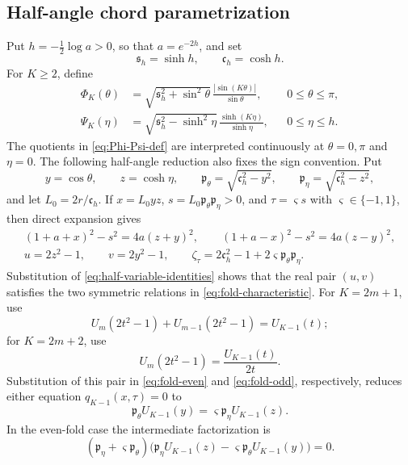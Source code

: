 \documentclass[preprints,article,accept,oneauthor]{Definitions/mdpi}
\numberwithin{equation}{section}
\theoremstyle{mdpi}
\theoremstyle{definition}
\begin{document}
\subsection{Half-angle chord parametrization}
\label{subsec:half-angle-chords}
Put \(h=-\tfrac12\log a>0\), so that \(a=e^{-2h}\), and set
\[
 \mathfrak s_h=\sinh h,\qquad \mathfrak c_h=\cosh h.
\]
For \(K\geq2\), define
\begin{equation}\label{eq:Phi-Psi-def}
\begin{aligned}
 \Phi_K(\theta)
 &=\sqrt{\mathfrak s_h^2+\sin^2\theta}\,
   \frac{|\sin(K\theta)|}{\sin\theta},
   &&0\leq\theta\leq\pi,\\
 \Psi_K(\eta)
 &=\sqrt{\mathfrak s_h^2-\sinh^2\eta}\,
   \frac{\sinh(K\eta)}{\sinh\eta},
   &&0\leq\eta\leq h.
\end{aligned}
\end{equation}
The quotients in \eqref{eq:Phi-Psi-def} are interpreted continuously at
\(\theta=0,\pi\) and \(\eta=0\).  The following half-angle reduction also
fixes the sign convention.  Put
\[
 y=\cos\theta,\qquad z=\cosh\eta,\qquad
 \mathfrak p_\theta=\sqrt{\mathfrak c_h^2-y^2},\qquad
 \mathfrak p_\eta=\sqrt{\mathfrak c_h^2-z^2},
\]
and let \(L_0=2r/\mathfrak c_h\).  If
\(x=L_0yz\), \(s=L_0\mathfrak p_\theta\mathfrak p_\eta>0\), and
\(\tau=\varsigma s\) with \(\varsigma\in\{-1,1\}\), then direct
expansion gives
\begin{equation}\label{eq:half-variable-identities}
\begin{gathered}
 (1+a+x)^2-s^2=4a(z+y)^2,\qquad
 (1+a-x)^2-s^2=4a(z-y)^2,\\
 u=2z^2-1,\qquad v=2y^2-1,\qquad
 \zeta_\tau=2\mathfrak c_h^2-1
 +2\varsigma\mathfrak p_\theta\mathfrak p_\eta.
\end{gathered}
\end{equation}
Substitution of \eqref{eq:half-variable-identities} shows that the real pair
\((u,v)\) satisfies the two symmetric relations in
\eqref{eq:fold-characteristic}.
For \(K=2m+1\), use
\[
 U_m(2t^2-1)+U_{m-1}(2t^2-1)=U_{K-1}(t);
\]
for \(K=2m+2\), use
\[
 U_m(2t^2-1)=\frac{U_{K-1}(t)}{2t}.
\]
Substitution of this pair in \eqref{eq:fold-even} and
\eqref{eq:fold-odd}, respectively, reduces either equation
\(q_{K-1}(x,\tau)=0\) to
\begin{equation}\label{eq:signed-half-chord}
 \mathfrak p_\theta U_{K-1}(y)
 =\varsigma\mathfrak p_\eta U_{K-1}(z).
\end{equation}
In the even-fold case the intermediate factorization is
\[
 (\mathfrak p_\eta+\varsigma\mathfrak p_\theta)
 \bigl(\mathfrak p_\eta U_{K-1}(z)
 -\varsigma\mathfrak p_\theta U_{K-1}(y)\bigr)=0.
\]
\end{document}

